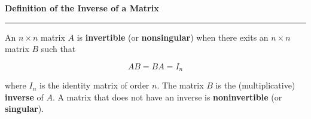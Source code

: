 \nopagenumbers
{\bf Definition of the Inverse of a Matrix}
\vskip 1mm
\hrule

\vskip 6pt
An $n\times n$ matrix $A$ is {\bf invertible} (or {\bf nonsingular}) when there exits an $n\times n$ matrix $B$ such that

$$AB=BA=I_n$$

where $I_n$ is the identity matrix of order $n$. The matrix $B$ is the (multiplicative) {\bf inverse} of $A$. A matrix that does not have an inverse is {\bf noninvertible} (or {\bf singular}).

\vfill\eject
\bye
